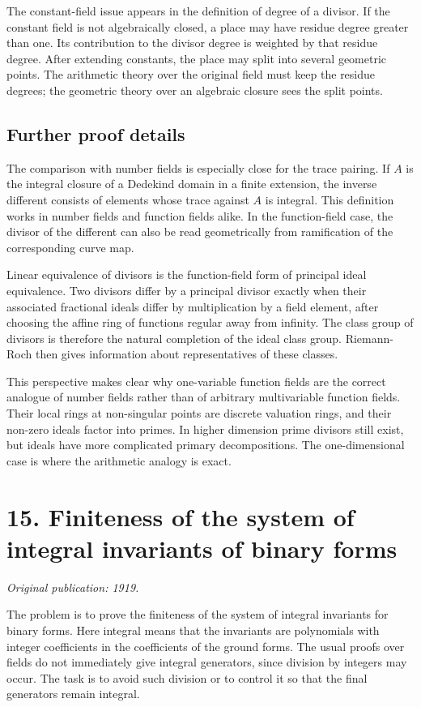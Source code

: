 \documentclass[12pt]{article}
\begin{document}
The constant-field issue appears in the definition of degree of a divisor. If the constant field is
not algebraically closed, a place may have residue degree greater than one. Its contribution to the
divisor degree is weighted by that residue degree. After extending constants, the place may split
into several geometric points. The arithmetic theory over the original field must keep the residue
degrees; the geometric theory over an algebraic closure sees the split points.


\subsection{Further proof details}

The comparison with number fields is especially close for the trace pairing. If \(A\) is the
integral closure of a Dedekind domain in a finite extension, the inverse different consists of
elements whose trace against \(A\) is integral. This definition works in number fields and function
fields alike. In the function-field case, the divisor of the different can also be read
geometrically from ramification of the corresponding curve map.

Linear equivalence of divisors is the function-field form of principal ideal equivalence. Two
divisors differ by a principal divisor exactly when their associated fractional ideals differ by
multiplication by a field element, after choosing the affine ring of functions regular away from
infinity. The class group of divisors is therefore the natural completion of the ideal class group.
Riemann-Roch then gives information about representatives of these classes.

This perspective makes clear why one-variable function fields are the correct analogue of number
fields rather than of arbitrary multivariable function fields. Their local rings at non-singular
points are discrete valuation rings, and their non-zero ideals factor into primes. In higher
dimension prime divisors still exist, but ideals have more complicated primary decompositions. The
one-dimensional case is where the arithmetic analogy is exact.


\section{15. Finiteness of the system of integral invariants of binary forms}

\textit{Original publication: 1919.}

The problem is to prove the finiteness of the system of integral invariants for binary forms. Here
integral means that the invariants are polynomials with integer coefficients in the coefficients of
the ground forms. The usual proofs over fields do not immediately give integral generators, since
division by integers may occur. The task is to avoid such division or to control it so that the
final generators remain integral.
\end{document}

